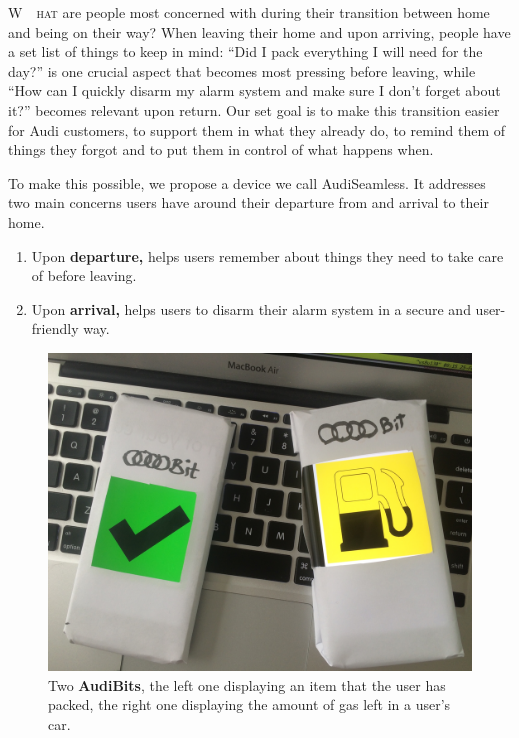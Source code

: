 

\lettrine[lines=2]{W}{\ \ hat} are people most concerned with during their transition between home and being on their way? When leaving their home and upon arriving, people have a set list of things to keep in mind: ``Did I pack everything I will need for the day?'' is one crucial aspect that becomes most pressing before leaving, while ``How can I quickly disarm my alarm system and make sure I don't forget about it?'' becomes relevant upon return. Our set goal is to make this transition easier for Audi customers, to support them in what they already do, to remind them of things they forgot and to put them in control of what happens when.

To make this possible, we propose a device we call AudiSeamless. It addresses two main concerns users have around their departure from and arrival to their home. 
\begin{enumerate}
    \item Upon \textbf{departure,} helps users remember about things they need to take care of before leaving.
    \item Upon \textbf{arrival,} helps users to disarm their alarm system in a secure and user-friendly way.
\end{enumerate}


\begin{figure}
  \centering
    \includegraphics[width=1.0\textwidth]{Figures/AudiBits.JPG}
  \caption{Two \textbf{AudiBits}, the left one displaying an item that the user has packed, the right one displaying the amount of gas left in a user's car.}
  \label{fig:audi_bits_summary}
\end{figure}

